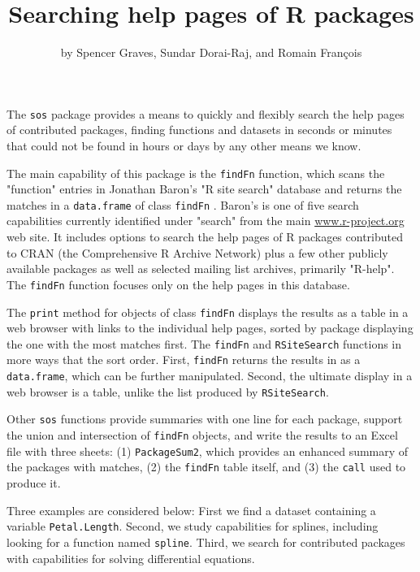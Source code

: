 \title{Searching help pages of R packages}
\author{by Spencer Graves, Sundar Dorai-Raj, and Romain Fran{\c c}ois}

\maketitle

The {\tt sos} package provides a means to quickly and flexibly
search the help pages of contributed packages, finding
functions and datasets in seconds or minutes that could not be
found in hours or days by any other means we know.

The main capability of this package is the {\tt findFn} function, 
which scans the "function" entries in Jonathan Baron's "R site search"
database and returns the matches in a {\tt data.frame} of class
{\tt findFn} \citep{JB09URL}.  Baron's is one of five
search capabilities currently identified under "search" from the main
\url{www.r-project.org} web site. It includes options to
search the help pages of R packages contributed to CRAN (the
Comprehensive R Archive Network) plus a few other publicly
available packages as well as selected mailing list archives,
primarily "R-help".  The {\tt findFn} function focuses only
on the help pages in this database.

The {\tt print} method for objects of class {\tt findFn}
displays the results as a table in a web
browser with links to the individual help pages, sorted by package
displaying the one with the most matches first.  The {\tt findFn} 
and {\tt RSiteSearch} functions in more ways that the sort order.  
First, {\tt findFn} returns
the results in \R{} as a {\tt data.frame}, which can be further
manipulated.  Second, the ultimate display in a web browser is a
table, unlike the list produced by {\tt RSiteSearch}.

Other {\tt sos} functions provide summaries with one line for each
package, support the union and intersection of {\tt findFn} objects,
and write the results to an Excel file with three sheets:  (1)
{\tt PackageSum2}, which provides an enhanced summary of the packages
with matches, (2) the {\tt findFn} table itself, and (3) the {\tt call}
used to produce it.

Three examples are considered below:  First we find a dataset
containing a variable {\tt Petal.Length}. Second, we study
\R{} capabilities for splines, including looking for a function
named {\tt spline}.  Third, we search for contributed \R{} packages
 with capabilities for solving differential equations.

